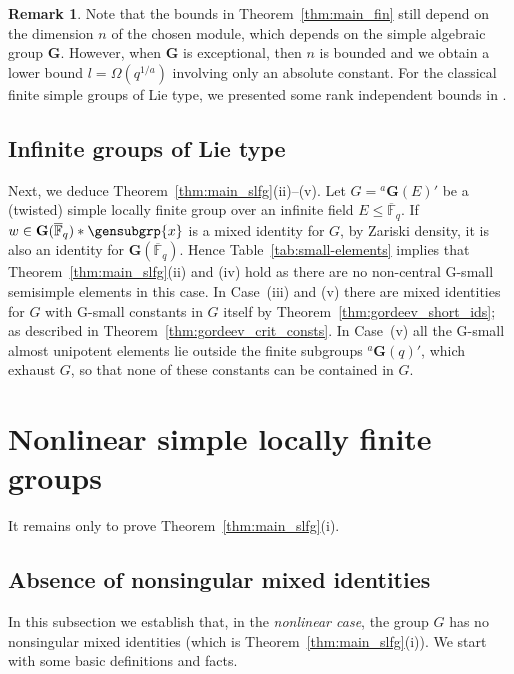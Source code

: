 \documentclass[a4paper,12pt]{amsproc}
\theoremstyle{plain}
\theoremstyle{definition}
\newtheorem{remark}[definition]{Remark}
\begin{document}
\begin{remark}
Note that the bounds in Theorem~\ref{thm:main_fin} still depend on the dimension $n$ of the chosen module, which depends on the simple algebraic group $\mathbf{G}$. However, when $\mathbf{G}$ is exceptional, then $n$ is bounded and we obtain a lower bound $l=\Omega(q^{1/a})$ involving only an absolute constant. For the classical finite simple groups of Lie type, we presented some rank independent bounds in \cite{bradfordschneiderthom2023length}.
\end{remark}

\subsection{Infinite groups of Lie type}

Next, we deduce Theorem~\ref{thm:main_slfg}(ii)--(v).
Let $G={}^a\mathbf{G}(E)'$ be a (twisted) simple locally finite group over an infinite field $E\leq\overline{\mathbb{F}}_q$. If $w\in\mathbf{G}(\overline{\mathbb{F}}_q)\ast\gensubgrp{x}$ is a mixed identity for $G$, by Zariski density, it is also an identity for $\mathbf{G}(\overline{\mathbb{F}}_q)$. Hence Table~\ref{tab:small-elements} implies that Theorem~\ref{thm:main_slfg}(ii) and (iv) hold as there are no non-central G-small semisimple elements in this case. In Case~(iii) and (v) there are mixed identities for $G$ with G-small constants in $G$ itself by Theorem~\ref{thm:gordeev_short_ids}; as described in Theorem~\ref{thm:gordeev_crit_consts}.
In Case~(v) all the G-small almost unipotent elements lie outside the finite subgroups ${}^a\mathbf{G}(q)'$, which exhaust $G$, so that none of these constants can be contained in $G$.

\section{Nonlinear simple locally finite groups}\label{sec:nonlin_simple_loc_fin_grps}

It remains only to prove Theorem~\ref{thm:main_slfg}(i).

\subsection{Absence of nonsingular mixed identities}
	
In this subsection we establish that, in the \emph{nonlinear case}, the group $G$ has no nonsingular mixed identities (which is Theorem~\ref{thm:main_slfg}(i)). We start with some basic definitions and facts.
	
\end{document}
